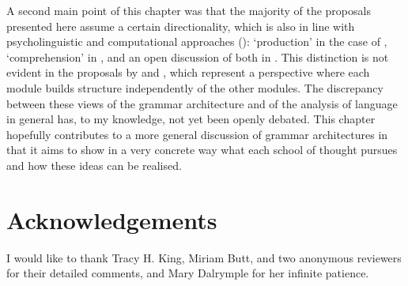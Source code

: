 \documentclass[output=paper,hidelinks]{langscibook}
\begin{document}
A second main point of this chapter was that the majority of the proposals presented here assume a certain directionality, which is also in line with psycholinguistic and computational approaches (): %
`production' in the case of \citet{buttking98}, `comprehension' in \citet{boegeletal09, boegel-etal2010, Oconnor2005}, and an open discussion of both in \citet{Boegel2015}. This distinction is not evident in the proposals by \citet{DM11} and \citet{MycockLowe2013}, which represent a perspective where each module builds structure independently of the other modules. The discrepancy between these views of the grammar architecture and of the analysis of language in general has, to my knowledge, not yet been openly debated. This chapter hopefully contributes to a more general discussion of grammar architectures in that it aims to show in a very concrete way what each school of thought pursues and how these ideas can be realised.


\section*{Acknowledgements}
I would like to thank Tracy H. King, Miriam Butt, and two anonymous reviewers for their detailed comments, and Mary Dalrymple for her infinite patience.


\printbibliography[heading=subbibliography,notkeyword=this]
\end{document}
